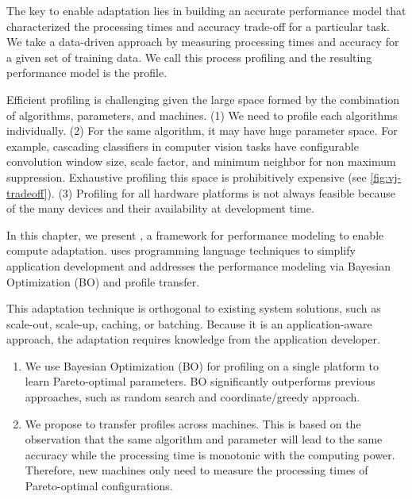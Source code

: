 The key to enable adaptation lies in building an accurate performance model that
characterized the processing times and accuracy trade-off for a particular
task. We take a data-driven approach by measuring processing times and accuracy
for a given set of training data. We call this process profiling and the
resulting performance model is the profile.

Efficient profiling is challenging given the large space formed by the
combination of algorithms, parameters, and machines. (1) We need to profile each
algorithms individually. (2) For the same algorithm, it may have huge parameter
space. For example, cascading classifiers in computer vision tasks have
configurable convolution window size, scale factor, and minimum neighbor for non
maximum suppression. Exhaustive profiling this space is prohibitively expensive
(see \autoref{fig:vj-tradeoff}). (3) Profiling for all hardware platforms is
not always feasible because of the many devices and their availability at
development time.


In this chapter, we present \brt{}, a framework for performance modeling to
enable compute adaptation. \brt{} uses programming language techniques to
simplify application development and addresses the performance modeling via
Bayesian Optimization (BO) and profile transfer.

This adaptation technique is orthogonal to existing system solutions, such as
scale-out, scale-up, caching, or batching. Because it is an application-aware
approach, the adaptation requires knowledge from the application developer.

\begin{enumerate}[leftmargin=*, topsep=5pt, itemsep=5pt]
\item We use Bayesian Optimization (BO) for profiling on a single platform to
  learn Pareto-optimal parameters. BO significantly outperforms previous
  approaches, such as random search and coordinate/greedy approach.
\item We propose to transfer profiles across machines. This is based on the
  observation that the same algorithm and parameter will lead to the same
  accuracy while the processing time is monotonic with the computing
  power. Therefore, new machines only need to measure the processing times of
  Pareto-optimal configurations.
\end{enumerate}


